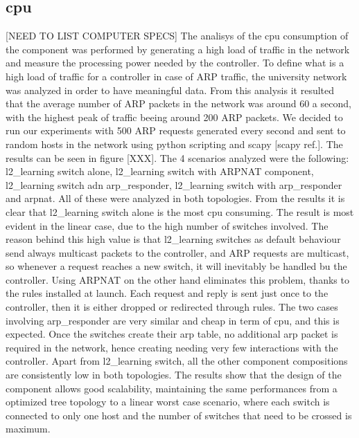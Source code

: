 \documentclass[11pt]{article}
\begin{document}
\subsection{cpu}
[NEED TO LIST COMPUTER SPECS]
The analisys of the cpu consumption of the component was performed by generating a high load of traffic in the network and measure the processing power needed by the controller. To define what is a high load of traffic for a controller in case of ARP traffic, the university network was analyzed in order to have meaningful data. From this analysis it resulted that the average number of ARP packets in the network was around 60 a second, with the highest peak of traffic beeing around 200 ARP packets. We decided to run our experiments with 500 ARP requests generated every second and sent to random hosts in the network using python scripting and scapy [scapy ref.].
The results can be seen in figure [XXX]. The 4 scenarios analyzed were the following: l2\_learning switch alone, l2\_learning switch with ARPNAT component, l2\_learning switch adn arp\_responder, l2\_learning switch with arp\_responder and arpnat. All of these were analyzed in both topologies.
From the results it is clear that l2\_learning switch alone is the most cpu consuming. The result is most evident in the linear case, due to the high number of switches involved. The reason behind this high value is that l2\_learning switches as default behaviour send always multicast packets to the controller, and ARP requests are multicast, so whenever a request reaches a new switch, it will inevitably be handled bu the controller. Using ARPNAT on the other hand eliminates this problem, thanks to the rules installed at launch. Each request and reply is sent just once to the controller, then it is either dropped or redirected through rules.
The two cases involving arp\_responder are very similar and cheap in term of cpu, and this is expected. Once the switches create their arp table, no additional arp packet is required in the network, hence creating needing very few interactions with the controller.
Apart from l2\_learning switch, all the other component compositions are consistently low in both topologies. The results show that the design of the component allows good scalability, maintaining the same performances from a optimized tree topology to a linear worst case scenario, where each switch is connected to only one host and the number of switches that need to be crossed is maximum.
\end{document}
